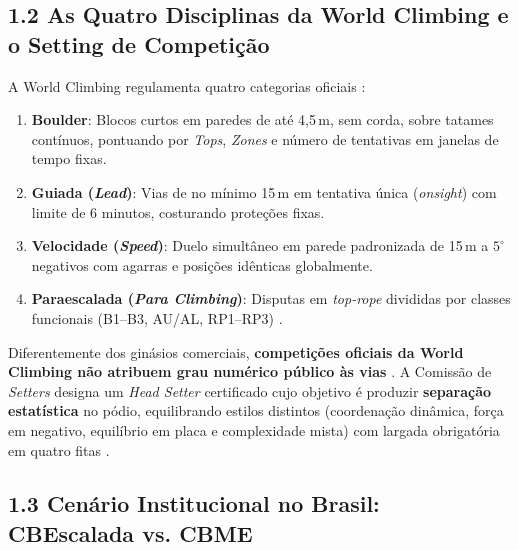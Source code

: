 \subsection*{1.2 As Quatro Disciplinas da World Climbing e o Setting de Competição}

A World Climbing regulamenta quatro categorias oficiais \cite{worldclimbing_about, ifsc_rules}:
\begin{enumerate}
    \item \textbf{Boulder}: Blocos curtos em paredes de até 4,5\,m, sem corda, sobre tatames contínuos, pontuando por \textit{Tops}, \textit{Zones} e número de tentativas em janelas de tempo fixas.
    \item \textbf{Guiada (\textit{Lead})}: Vias de no mínimo 15\,m em tentativa única (\textit{onsight}) com limite de 6 minutos, costurando proteções fixas.
    \item \textbf{Velocidade (\textit{Speed})}: Duelo simultâneo em parede padronizada de 15\,m a $5^\circ$ negativos com agarras e posições idênticas globalmente.
    \item \textbf{Paraescalada (\textit{Para Climbing})}: Disputas em \textit{top-rope} divididas por classes funcionais (B1--B3, AU/AL, RP1--RP3) \cite{ifsc_paraclimbing}.
\end{enumerate}

Diferentemente dos ginásios comerciais, \textbf{competições oficiais da World Climbing não atribuem grau numérico público às vias} \cite{ifsc_rules}. A Comissão de \textit{Setters} designa um \textit{Head Setter} certificado cujo objetivo é produzir \textbf{separação estatística} no pódio, equilibrando estilos distintos (coordenação dinâmica, força em negativo, equilíbrio em placa e complexidade mista) com largada obrigatória em quatro fitas \cite{ifsc_rules}.

\subsection*{1.3 Cenário Institucional no Brasil: CBEscalada vs. CBME}

